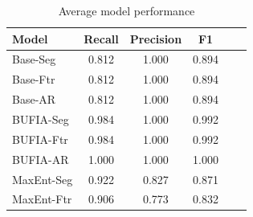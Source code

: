 \begin{table}[t]
\setlength{\tabcolsep}{4pt}
\centering
\begin{tabular}{lccccc}
\toprule
Model       & Recall & Precision & F1    \\
\midrule
Base-Seg    & 0.812  & 1.000     & 0.894 \\
Base-Ftr    & 0.812  & 1.000     & 0.894 \\
Base-AR     & 0.812  & 1.000     & 0.894 \\
\midrule
BUFIA-Seg   & 0.984  & 1.000     & 0.992 \\
BUFIA-Ftr   & 0.984  & 1.000     & 0.992 \\
BUFIA-AR    & 1.000  & 1.000     & 1.000 \\
\midrule
MaxEnt-Seg  & 0.922  & 0.827     & 0.871 \\
MaxEnt-Ftr  & 0.906  & 0.773     & 0.832 \\

\bottomrule
\end{tabular}
\caption{Average model performance}
\label{tab:model_comparison}
\end{table}